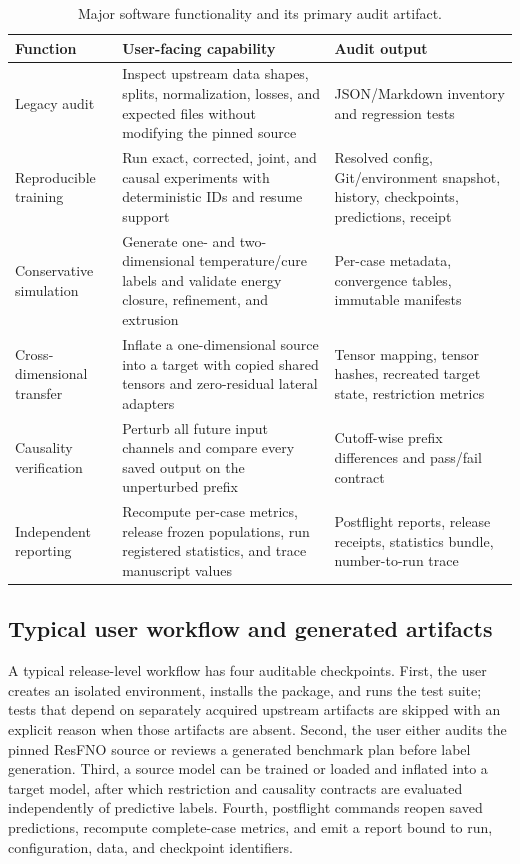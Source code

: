 \documentclass[preprint,12pt]{elsarticle}
\begin{document}
\begin{table}[!ht]
\centering
\small
\caption{Major software functionality and its primary audit artifact.}
\label{tab:functionality}
\begin{tabularx}{\textwidth}{>{\raggedright\arraybackslash}p{}
                              >{\raggedright\arraybackslash}p{}
                              X}
\toprule
Function & User-facing capability & Audit output \\
\midrule
Legacy audit & Inspect upstream data shapes, splits, normalization, losses, and expected files without modifying the pinned source & JSON/Markdown inventory and regression tests \\
Reproducible training & Run exact, corrected, joint, and causal experiments with deterministic IDs and resume support & Resolved config, Git/environment snapshot, history, checkpoints, predictions, receipt \\
Conservative simulation & Generate one- and two-dimensional temperature/cure labels and validate energy closure, refinement, and extrusion & Per-case metadata, convergence tables, immutable manifests \\
Cross-dimensional transfer & Inflate a one-dimensional source into a target with copied shared tensors and zero-residual lateral adapters & Tensor mapping, tensor hashes, recreated target state, restriction metrics \\
Causality verification & Perturb all future input channels and compare every saved output on the unperturbed prefix & Cutoff-wise prefix differences and pass/fail contract \\
Independent reporting & Recompute per-case metrics, release frozen populations, run registered statistics, and trace manuscript values & Postflight reports, release receipts, statistics bundle, number-to-run trace \\
\bottomrule
\end{tabularx}
\end{table}

\subsection{Typical user workflow and generated artifacts}

A typical release-level workflow has four auditable checkpoints. First, the
user creates an isolated environment, installs the package, and runs the test
suite; tests that depend on separately acquired upstream artifacts are skipped
with an explicit reason when those artifacts are absent. Second, the user
either audits the pinned ResFNO source or reviews a generated benchmark plan
before label generation. Third, a source model can be trained or loaded and
inflated into a target model, after which restriction and causality contracts
are evaluated independently of predictive labels. Fourth, postflight commands
reopen saved predictions, recompute complete-case metrics, and emit a report
bound to run, configuration, data, and checkpoint identifiers.
\end{document}

